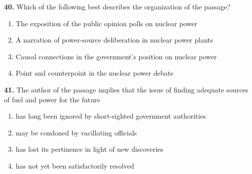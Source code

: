 \documentclass[12pt]{article}
\begin{document}
\par
\vspace{0.25\baselineskip}
\noindent\textbf{40.} Which of the following best describes the organization of the passage?
\begin{enumerate}[label=(\Alph*),leftmargin=*,itemsep=0.2em]
\item The exposition of the public opinion polls on nuclear power
\item A narration of power-source deliberation in nuclear power plants
\item Causal connections in the government's position on nuclear power
\item Point and counterpoint in the nuclear power debate
\end{enumerate}
\par
\vspace{0.25\baselineskip}
\noindent\textbf{41.} The author of the passage implies that the issue of finding adequate sources of fuel and power for the future
\begin{enumerate}[label=(\Alph*),leftmargin=*,itemsep=0.2em]
\item has long been ignored by short-sighted government authorities
\item may be condoned by vacillating officials
\item has lost its pertinence in light of new discoveries
\item has not yet been satisfactorily resolved
\end{enumerate}
\par
\vspace{0.25\baselineskip}
\end{document}
